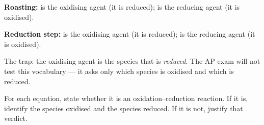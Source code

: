 \documentclass{apchem-exam}
\begin{document}
\begin{parts}
{\begin{apcanswer}
        \textbf{Roasting:}  is the oxidising agent (it is reduced);
         is the reducing agent (it is oxidised).

        \textbf{Reduction step:}  is the oxidising agent (it is
        reduced);  is the reducing agent (it is oxidised).

        The trap: the oxidising agent is the species that is
        \emph{reduced}. The AP exam will not test this vocabulary --- it
        asks only which species is oxidised and which is
        reduced.\end{apcanswer}}
\end{parts}

\begin{rubric}
\end{rubric}


For each equation, state whether it is an oxidation--reduction reaction. If
it is, identify the species oxidised and the species reduced. If it is not,
justify that verdict.
\end{document}
